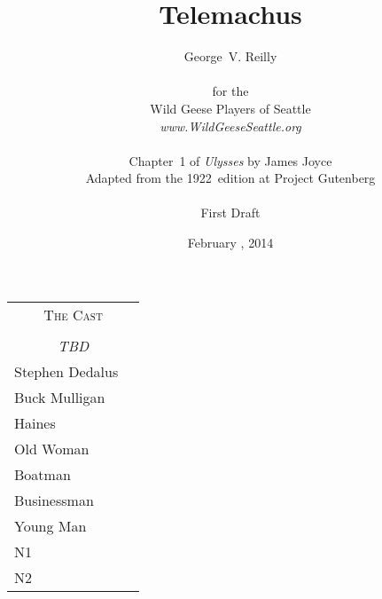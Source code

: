 



\title{\Huge Telemachus}
\author{George~V. Reilly\\
\\
{\small for the}\\
Wild Geese Players of Seattle\\
{\emph{www.WildGeeseSeattle.org}}\\
\\
{\small Chapter~1 of \emph{Ulysses} by James Joyce}\\
{\small Adapted from the 1922~edition at Project Gutenberg}
\\
\\
{\small First Draft}}
\date{February , 2014}
\raggedbottom



\maketitle
\thispagestyle{empty}
\pagebreak

\begin{tabular}{lp{10cm}}
    \multicolumn{2}{c}{\Large \textsc{The Cast}} \\
\\
    \multicolumn{2}{c}{\large \textit{TBD}} \\
Stephen Dedalus \\
Buck Mulligan \\
Haines \\
Old Woman \\
Boatman \\
Businessman \\
Young Man \\
N1 \\
N2 \\
\end{tabular}

\thispagestyle{empty}
\newpage


\setcounter{page}{1}






